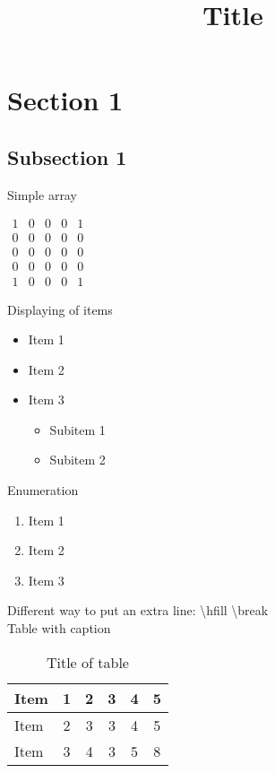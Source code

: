 \documentclass[a4paper,12pt]{article}
\begin{document}
	\title{Title}
	
	\tableofcontents
	\newpage
	
	\section{Section 1}
	
	\subsection{Subsection 1}
	
	\noindent Simple array
	\begin{center}
		$\begin{array}{ccccc}
		1 & 0 & 0 & 0 & 1 \\
		0 & 0 & 0 & 0 & 0 \\
		0 & 0 & 0 & 0 & 0 \\
		0 & 0 & 0 & 0 & 0 \\
		1 & 0 & 0 & 0 & 1 
		\end{array}$
	\end{center}

	\noindent Displaying of items
	\begin{itemize}
		\setlength \itemsep{-0.5em}
		\item Item 1
		\color{red}
		\item Item 2
		\color{black}
		\item Item 3
		\begin{itemize}
			\item Subitem 1
			\item Subitem 2
		\end{itemize}
	\end{itemize}

	\noindent Enumeration
	\begin{enumerate}
		\item Item 1
		\item Item 2
		\item Item 3
	\end{enumerate}
	Different way to put an extra line: \textbackslash hfill \textbackslash break \\
	\hfill \break
	\noindent Table with caption
	\begin{table}[h]
		\caption{Title of table}
		\centering
		
		\begin{tabular}{| l | c | c | c | c | c |}
			\hline
			Item & 1 & 2 & 3 & 4 & 5 \\
			\hline
			Item & 2 & 3 & 3 & 4 & 5 \\
			\hline
			Item & 3 & 4 & 3 & 5 & 8 \\
			\hline
		\end{tabular}
	
	\end{table}
\end{document}

